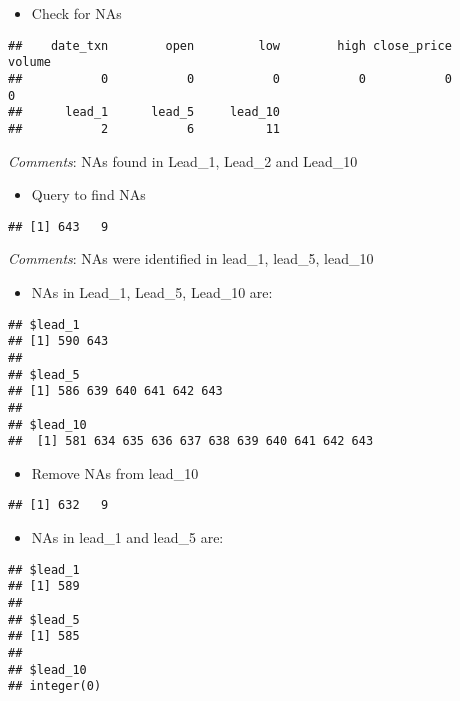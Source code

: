 \documentclass[]{article}
\providecommand{\tightlist}{%
  \setlength{\itemsep}{0pt}\setlength{\parskip}{0pt}}
\begin{document}
\begin{itemize}
\tightlist
\item
  Check for NAs
\end{itemize}

\begin{verbatim}
##    date_txn        open         low        high close_price      volume 
##           0           0           0           0           0           0 
##      lead_1      lead_5     lead_10 
##           2           6          11
\end{verbatim}

\emph{Comments}: NAs found in Lead\_1, Lead\_2 and Lead\_10

\begin{itemize}
\tightlist
\item
  Query to find NAs
\end{itemize}

\begin{verbatim}
## [1] 643   9
\end{verbatim}

\emph{Comments}: NAs were identified in lead\_1, lead\_5, lead\_10

\begin{itemize}
\tightlist
\item
  NAs in Lead\_1, Lead\_5, Lead\_10 are:
\end{itemize}

\begin{verbatim}
## $lead_1
## [1] 590 643
## 
## $lead_5
## [1] 586 639 640 641 642 643
## 
## $lead_10
##  [1] 581 634 635 636 637 638 639 640 641 642 643
\end{verbatim}

\begin{itemize}
\tightlist
\item
  Remove NAs from lead\_10
\end{itemize}

\begin{verbatim}
## [1] 632   9
\end{verbatim}

\begin{itemize}
\tightlist
\item
  NAs in lead\_1 and lead\_5 are:
\end{itemize}

\begin{verbatim}
## $lead_1
## [1] 589
## 
## $lead_5
## [1] 585
## 
## $lead_10
## integer(0)
\end{verbatim}
\end{document}
